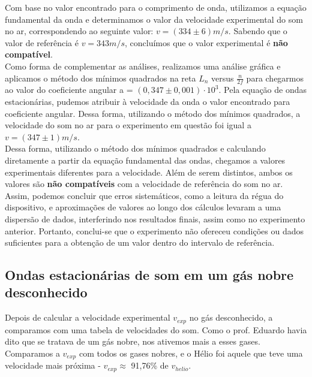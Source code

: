Com base no valor encontrado para o comprimento de onda, utilizamos a equação fundamental da onda e determinamos o valor da velocidade experimental do som no ar, correspondendo ao seguinte valor: $v = (334 \pm 6) m/s $. Sabendo que o valor de referência é $v = 343 m/s$, concluímos que o valor experimental é \textbf{não compatível}.\\

Como forma de complementar as análises, realizamos uma análise gráfica e aplicamos o método dos mínimos quadrados na reta $L_n$ versus $\frac{n}{2f}$ para chegarmos ao valor do coeficiente angular  a = $(0,347 \pm 0,001)\cdot 10^3$. Pela equação de ondas estacionárias, pudemos atribuir à velocidade da onda o valor encontrado para coeficiente angular. Dessa forma, utilizando o método dos mínimos quadrados, a velocidade do som no ar para o experimento em questão foi igual a $v = (347 \pm 1) m/s$.\\

Dessa forma, utilizando o método dos mínimos quadrados e calculando diretamente a partir da equação fundamental das ondas, chegamos a valores experimentais diferentes para a velocidade. Além de serem distintos, ambos os valores são \textbf{não compatíveis} com a velocidade de referência do som no ar. Assim, podemos concluir que erros sistemáticos, como a leitura da régua do dispositivo, e aproximações de valores ao longo dos cálculos levaram a uma dispersão de dados, interferindo nos resultados finais, assim como no experimento anterior. Portanto, conclui-se que o experimento não ofereceu condições ou dados suficientes para a obtenção de um valor dentro do intervalo de referência.\\

\subsection{Ondas estacionárias de som em um gás nobre
desconhecido}

Depois de calcular a velocidade experimental $v_{exp}$ no gás desconhecido, a comparamos com uma tabela de velocidades do som. Como o prof. Eduardo havia dito que se tratava de um gás nobre, nos ativemos mais a esses gases. \\

Comparamos a $v_{exp}$ com todos os gases nobres, e o Hélio foi aquele que teve uma velocidade mais próxima - $v_{exp} \approx$ 91,76\% de $v_{helio}$.

